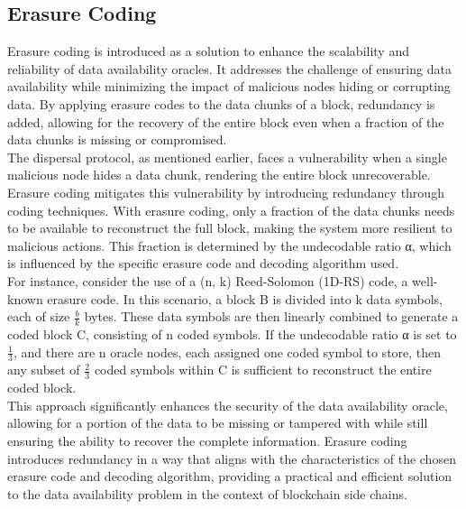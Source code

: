 \documentclass{report}
\begin{document}
\subsection{Erasure Coding}
Erasure coding is introduced as a solution to enhance the scalability and reliability of data availability oracles. It addresses the challenge of ensuring data availability while minimizing the impact of malicious nodes hiding or corrupting data. By applying erasure codes to the data chunks of a block, redundancy is added, allowing for the recovery of the entire block even when a fraction of the data chunks is missing or compromised.\\
The dispersal protocol, as mentioned earlier, faces a vulnerability when a single malicious node hides a data chunk, rendering the entire block unrecoverable. Erasure coding mitigates this vulnerability by introducing redundancy through coding techniques. With erasure coding\cite{reference2}, only a fraction of the data chunks needs to be available to reconstruct the full block, making the system more resilient to malicious actions. This fraction is determined by the undecodable ratio α, which is influenced by the specific erasure code and decoding algorithm used.\\
For instance, consider the use of a (n, k) Reed-Solomon (1D-RS) code\cite{reference3}, a well-known erasure code. In this scenario, a block B is divided into k data symbols, each of size $\frac{b}{k}$ bytes. These data symbols are then linearly combined to generate a coded block C, consisting of n coded symbols. If the undecodable ratio α is set to $\frac{1}{3}$, and there are n oracle nodes, each assigned one coded symbol to store, then any subset of $\frac{2}{3}$ coded symbols within C is sufficient to reconstruct the entire coded block.\\
This approach significantly enhances the security of the data availability oracle, allowing for a portion of the data to be missing or tampered with while still ensuring the ability to recover the complete information. Erasure coding introduces redundancy in a way that aligns with the characteristics of the chosen erasure code and decoding algorithm, providing a practical and efficient solution to the data availability problem in the context of blockchain side chains.
\end{document}
